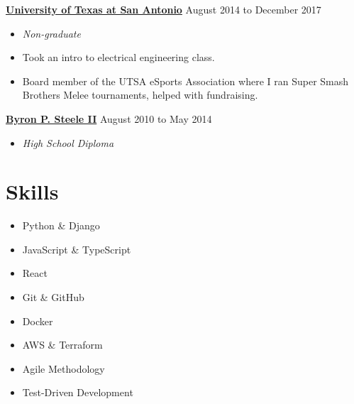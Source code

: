 \documentclass[10pt]{article}
\begin{document}
  \textbf{\href{https://www.utsa.edu/}{University of Texas at San Antonio}} \hfill {August 2014 to December 2017}
   \begin{itemize}
     \item[] \textit{Non-graduate}
     \item[] Took an intro to electrical engineering class.
     \item[] Board member of the UTSA eSports Association where I ran Super Smash Brothers Melee tournaments, helped with fundraising.
   \end{itemize}

  \textbf{\href{https://www.scuc.txed.net/ByronSteele}{Byron P. Steele II}} \hfill {August 2010 to May 2014}
   \begin{itemize}
     \item[] \textit{High School Diploma}
   \end{itemize}

  \section*{Skills}

   \begin{multicols}{2}
   \begin{itemize}
        \item[] Python \& Django
        \item[] JavaScript \& TypeScript
        \item[] React
        \item[] Git \& GitHub
        \item[] Docker
        \item[] AWS \& Terraform
        \item[] Agile Methodology
        \item[] Test-Driven Development
   \end{itemize}
   \end{multicols}
\end{document}
